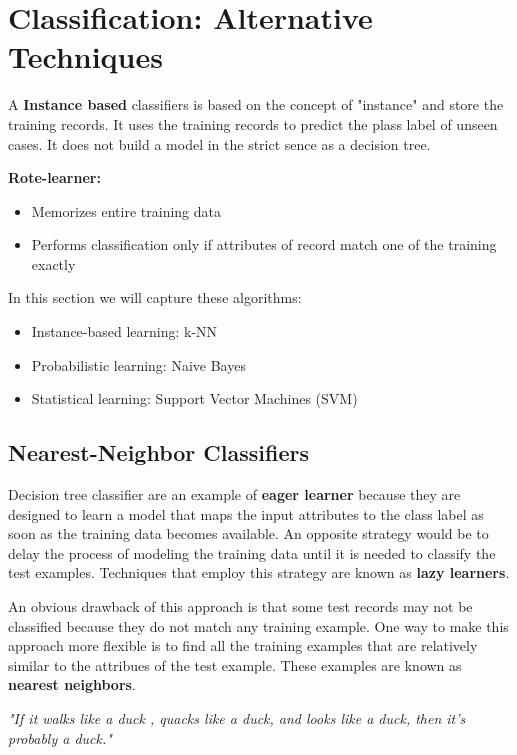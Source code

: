 \chapter{Classification: Alternative Techniques}
	
	A {\bf Instance based} classifiers is based on the concept of "instance" and store
	the training records. It uses the training records to predict the plass label
	of unseen cases. It does not build a model in the strict sence as a decision tree. 

	{\bf Rote-learner:}
	\begin{itemize}
		\item Memorizes entire training data
		\item Performs classification only if attributes of record match
		one of the training exactly
	\end{itemize}

	In this section we will capture these algorithms: 
	\begin{itemize}
		\item Instance-based learning: k-NN
		\item Probabilistic learning: Naive Bayes
		\item Statistical learning: Support Vector Machines (SVM)
	\end{itemize}


	
	\clearpage
	\section{Nearest-Neighbor Classifiers}

		Decision tree classifier are an example of {\bf eager learner} because
		they are designed to learn a model that maps the input attributes to 
		the class label as soon as the training data becomes available. 
		An opposite strategy would be to delay the process of modeling the 
		training data until it is needed to classify the test examples.
		Techniques that employ this strategy are known as {\bf lazy learners}.

		An obvious drawback of this approach is that some test records may not
		be classified because they do not match any training example. 
		One way to make this approach more flexible is to find all the
		training examples that are relatively similar to the attribues of the
		test example. These examples are known as {\bf nearest neighbors}.

		\vspace{0.3cm}
		{\it \Large "If it walks like a duck , quacks like a duck, and looks like a duck,
		then it's probably a duck."}

